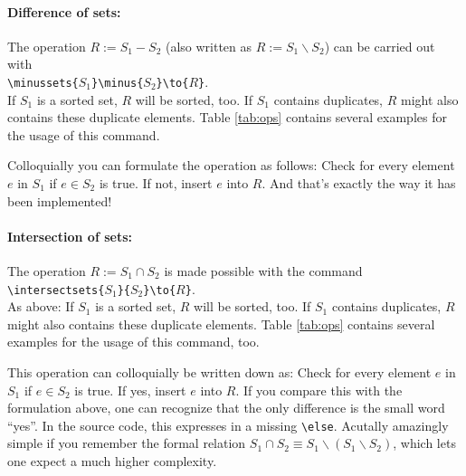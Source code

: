 \paragraph{Difference of sets:}The operation $R := S_1 - S_2$ (also written as $R := S_1 \backslash S_2$) can be carried out with\\
\mbox{}\hspace{2em}\verb|\minussets{|$S_1$\verb|}\minus{|$S_2$\verb|}\to{|$R$\verb|}|.\\
If $S_1$ is a sorted set, $R$ will be sorted, too. If $S_1$ contains duplicates, $R$ might also contains these duplicate elements. Table \ref{tab:ops} contains several examples for the usage of this command.

Colloquially you can formulate the operation as follows: Check for every element $e$ in $S_1$ if $e \in S_2$ is true. If not, insert $e$ into $R$. And that's exactly the way it has been implemented!

\paragraph{Intersection of sets:} The operation $R := S_1 \cap S_2$ is made possible with the command\\
\mbox{}\hspace{2em}\verb|\intersectsets{|$S_1$\verb|}{|$S_2$\verb|}\to{|$R$\verb|}|.\\
As above: If $S_1$ is a sorted set, $R$ will be sorted, too. If $S_1$ contains duplicates, $R$ might also contains these duplicate elements. Table \ref{tab:ops} contains several examples for the usage of this command, too.

This operation can colloquially be written down as: Check for every element $e$ in $S_1$ if $e \in S_2$ is true. If yes, insert $e$ into $R$. If you compare this with the formulation above, one can recognize that the only difference is the small word ``yes''. 
In the source code, this expresses in a missing \verb|\else|. Acutally amazingly simple if you remember the formal relation $S_1 \cap S_2 \equiv S_1 \backslash (S_1\backslash S_2)$, which lets one expect a much higher complexity.

